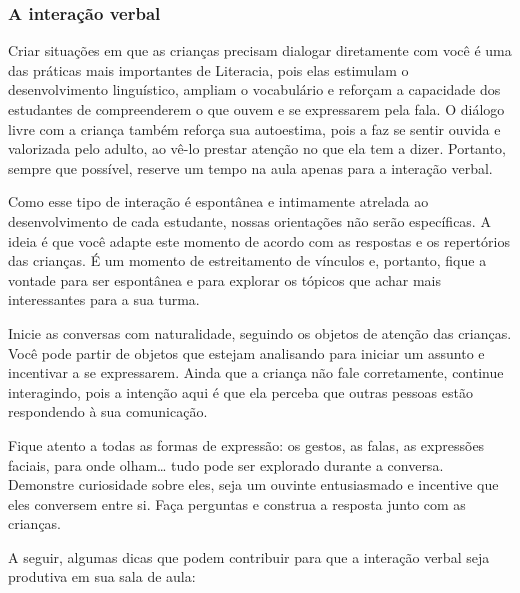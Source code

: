 \documentclass[11pt]{extarticle}
\begin{document}
\subsubsection{A interação verbal} 
Criar situações em que as crianças precisam dialogar diretamente com 
você é uma das práticas mais importantes de Literacia, pois elas estimulam 
o desenvolvimento linguístico, ampliam o vocabulário e reforçam a 
capacidade dos estudantes de compreenderem o que ouvem e se expressarem 
pela fala. O diálogo livre com a criança também reforça sua autoestima, pois 
a faz se sentir ouvida e valorizada pelo adulto, ao vê-lo prestar atenção 
no que ela tem a dizer. Portanto, sempre que possível, reserve um tempo na 
aula apenas para a interação verbal. 

Como esse tipo de interação é espontânea e intimamente atrelada ao 
desenvolvimento de cada estudante, nossas orientações não serão específicas. 
A ideia é que você adapte este momento de acordo com as respostas e os 
repertórios das crianças. É um momento de estreitamento de vínculos e, portanto, 
fique a vontade para ser espontânea e para explorar os tópicos que achar 
mais interessantes para a sua turma.

Inicie as conversas com naturalidade, seguindo os objetos de atenção das crianças. 
Você pode partir de objetos que estejam analisando
para iniciar um assunto e incentivar a se expressarem. Ainda
que a criança não fale corretamente, continue interagindo, pois a
intenção aqui é que ela perceba que outras pessoas estão respondendo à sua comunicação.

Fique atento a todas as formas de expressão: os gestos, as falas, as 
expressões faciais, para onde olham\ldots{} tudo pode ser explorado durante a conversa. 
Demonstre curiosidade sobre eles, seja um ouvinte entusiasmado e incentive que eles 
conversem entre si. Faça perguntas e construa a resposta junto com as crianças. 

A seguir, algumas dicas que podem contribuir para que a interação verbal 
seja produtiva em sua sala de aula: 
\end{document}
